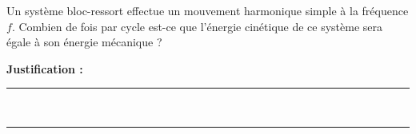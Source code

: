 Un système bloc-ressort effectue un mouvement harmonique simple à la fréquence $f$. Combien de fois par cycle est-ce que l’énergie cinétique de ce système sera égale à son énergie mécanique ?

\choices

\noindent\textbf{Justification :} \hrulefill \\[2.5ex]
\rule{\linewidth}{0.4pt} \\[2.5ex]
\rule{\linewidth}{0.4pt}
\vfill